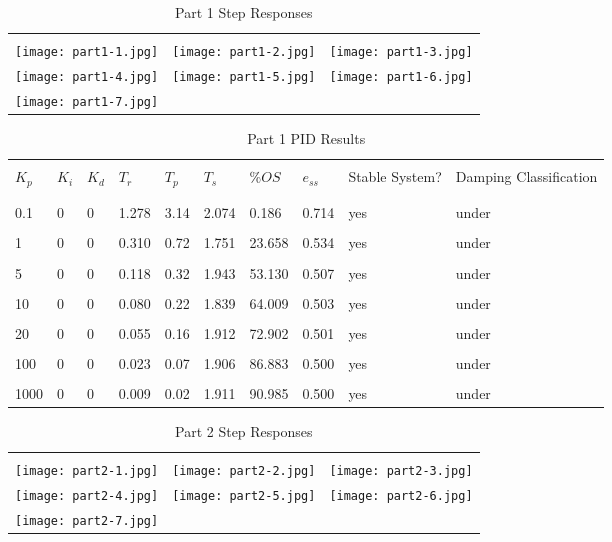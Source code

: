 
\begin{table}[H]
\begin{tabular}{ccc}
\toprule
\\ \texttt{[image: part1-1.jpg]} 
& \texttt{[image: part1-2.jpg]} 
& \texttt{[image: part1-3.jpg]} 
\\ \texttt{[image: part1-4.jpg]} 
& \texttt{[image: part1-5.jpg]} 
& \texttt{[image: part1-6.jpg]} 
\\ \texttt{[image: part1-7.jpg]} 
\\ \bottomrule
\end{tabular}
\caption{Part 1 Step Responses}
\end{table}
\begin{table}[H]
	\begin{tabularx}{\textwidth}{XXXXXXXXXX}
		\toprule
		\\ $K_p$ & $K_i$ & $K_d$ & $T_r$ & $T_p$ & $T_s$ & $\%OS$ & $e_{ss}$ 
		& Stable System? & Damping Classification
		\\ \midrule
		
\\\midrule\\0.1&0&0&1.278&3.14&2.074&0.186&0.714&yes&under 
\\\midrule\\1&0&0&0.310&0.72&1.751&23.658&0.534&yes&under 
\\\midrule\\5&0&0&0.118&0.32&1.943&53.130&0.507&yes&under 
\\\midrule\\10&0&0&0.080&0.22&1.839&64.009&0.503&yes&under 
\\\midrule\\20&0&0&0.055&0.16&1.912&72.902&0.501&yes&under 
\\\midrule\\100&0&0&0.023&0.07&1.906&86.883&0.500&yes&under 
\\\midrule\\1000&0&0&0.009&0.02&1.911&90.985&0.500&yes&under 
		\\ \bottomrule
	\end{tabularx}
	\caption{Part 1 PID Results}
	\label{tab:pid1SimResults}
\end{table}
\begin{table}[H]
\begin{tabular}{ccc}
\toprule
\\ \texttt{[image: part2-1.jpg]} 
& \texttt{[image: part2-2.jpg]} 
& \texttt{[image: part2-3.jpg]} 
\\ \texttt{[image: part2-4.jpg]} 
& \texttt{[image: part2-5.jpg]} 
& \texttt{[image: part2-6.jpg]} 
\\ \texttt{[image: part2-7.jpg]} 
\\ \bottomrule
\end{tabular}
\caption{Part 2 Step Responses}
\end{table}
